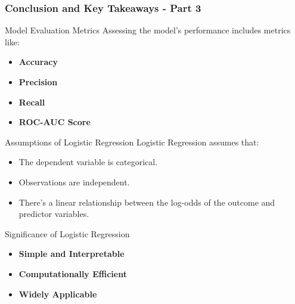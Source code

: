 \documentclass[aspectratio=169]{beamer}
\begin{document}
\begin{frame}[fragile]
    \frametitle{Conclusion and Key Takeaways - Part 3}
    \begin{block}{Model Evaluation Metrics}
        Assessing the model's performance includes metrics like:
        \begin{itemize}
            \item \textbf{Accuracy}
            \item \textbf{Precision}
            \item \textbf{Recall}
            \item \textbf{ROC-AUC Score}
        \end{itemize}
    \end{block}
    
    \begin{block}{Assumptions of Logistic Regression}
        Logistic Regression assumes that:
        \begin{itemize}
            \item The dependent variable is categorical.
            \item Observations are independent.
            \item There's a linear relationship between the log-odds of the outcome and predictor variables.
        \end{itemize}
    \end{block}

    \begin{block}{Significance of Logistic Regression}
        \begin{itemize}
            \item \textbf{Simple and Interpretable}
            \item \textbf{Computationally Efficient}
            \item \textbf{Widely Applicable}
        \end{itemize}
    \end{block}
\end{frame}
\end{document}
